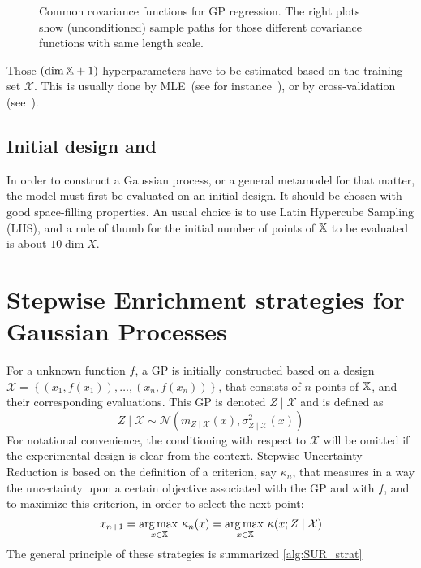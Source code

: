 \documentclass[../../Main_ManuscritThese.tex]{subfiles}
\newcommand\imgpath{/home/victor/acadwriting/Manuscrit/Text/Chapter4/img/}
\begin{document}
  
\begin{figure}[ht]
  \centering
  
  \caption{\label{fig:cov_fc_examples} Common covariance functions for GP regression. The right plots show (unconditioned) sample paths for those different covariance functions with same length scale.}
\end{figure}

Those $(\dim \mathbb{X} + 1)$ hyperparameters have to be estimated based on the training set $\mathcal{X}$. This is usually done by MLE~(see for instance~\cite{ribaud_robustness_2019}), or by cross-validation (see~\cite{ginsbourger_note_2009}).

\subsection{Initial design and }
In order to construct a Gaussian process, or a general metamodel for that matter, the model must first be evaluated on an initial design. It should be chosen with good space-filling properties. An usual choice is to use Latin Hypercube Sampling (LHS), and a rule of thumb for the initial number of points of $\mathbb{X}$ to be evaluated is about $10\dim X $.



\section{Stepwise Enrichment strategies for Gaussian Processes}
\label{sec:enrichment_strategies}

For a unknown function $f$, a GP is initially constructed based on a design $\mathcal{X} = \left\{\left(x_1,f(x_1)\right), \dots, \left(x_n, f(x_n)\right)\right\}$, that consists of $n$ points of $\mathbb{X}$, and their corresponding evaluations. This GP is denoted $Z \mid \mathcal{X}$ and is defined as
\begin{equation}
  \label{eq:ZgivenXGP}
  Z\mid \mathcal{X} \sim \mathcal{N}(m_{Z\mid\mathcal{X}}(x),\sigma^2_{Z\mid\mathcal{X}}(x))
\end{equation}
For notational convenience, the conditioning with respect to $\mathcal{X}$ will be omitted if the experimental design is clear from the context.
Stepwise Uncertainty Reduction is based on the definition of a criterion, say $\kappa_n$, that measures in a way the uncertainty upon a certain objective associated with the GP and with $f$, and to maximize this criterion, in order to select the next point:
\begin{equation}
  x_{n+1} = \operatorname*{arg\,max \,}_{x\in\mathbb{X}} \kappa_n(x) = \operatorname*{arg\,max \,}_{x\in\mathbb{X}} \kappa(x; Z \mid \mathcal{X})
\end{equation}
The general principle of these strategies is summarized \cref{alg:SUR_strat}
\end{document}
